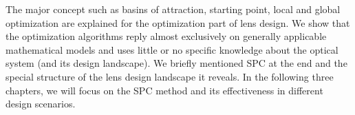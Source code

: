 The major concept such as basins of attraction, starting point, local and global optimization are explained for the optimization part of lens design. We show that the optimization algorithms reply almost exclusively on generally applicable mathematical models and uses little or no specific knowledge about the optical system (and its design landscape). We briefly mentioned SPC at the end and the special structure of the lens design landscape it reveals. In the following three chapters, we will focus on the SPC method and its effectiveness in different design scenarios. 

